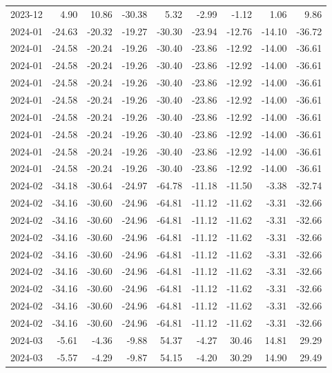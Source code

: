 \begin{table}[ht]
\begin{tabular}{lrrrrrrrr}
  2023-12 & 4.90 & 10.86 & -30.38 & 5.32 & -2.99 & -1.12 & 1.06 & 9.86 \\ 
  2024-01 & -24.63 & -20.32 & -19.27 & -30.30 & -23.94 & -12.76 & -14.10 & -36.72 \\ 
  2024-01 & -24.58 & -20.24 & -19.26 & -30.40 & -23.86 & -12.92 & -14.00 & -36.61 \\ 
  2024-01 & -24.58 & -20.24 & -19.26 & -30.40 & -23.86 & -12.92 & -14.00 & -36.61 \\ 
  2024-01 & -24.58 & -20.24 & -19.26 & -30.40 & -23.86 & -12.92 & -14.00 & -36.61 \\ 
  2024-01 & -24.58 & -20.24 & -19.26 & -30.40 & -23.86 & -12.92 & -14.00 & -36.61 \\ 
  2024-01 & -24.58 & -20.24 & -19.26 & -30.40 & -23.86 & -12.92 & -14.00 & -36.61 \\ 
  2024-01 & -24.58 & -20.24 & -19.26 & -30.40 & -23.86 & -12.92 & -14.00 & -36.61 \\ 
  2024-01 & -24.58 & -20.24 & -19.26 & -30.40 & -23.86 & -12.92 & -14.00 & -36.61 \\ 
  2024-01 & -24.58 & -20.24 & -19.26 & -30.40 & -23.86 & -12.92 & -14.00 & -36.61 \\ 
  2024-02 & -34.18 & -30.64 & -24.97 & -64.78 & -11.18 & -11.50 & -3.38 & -32.74 \\ 
  2024-02 & -34.16 & -30.60 & -24.96 & -64.81 & -11.12 & -11.62 & -3.31 & -32.66 \\ 
  2024-02 & -34.16 & -30.60 & -24.96 & -64.81 & -11.12 & -11.62 & -3.31 & -32.66 \\ 
  2024-02 & -34.16 & -30.60 & -24.96 & -64.81 & -11.12 & -11.62 & -3.31 & -32.66 \\ 
  2024-02 & -34.16 & -30.60 & -24.96 & -64.81 & -11.12 & -11.62 & -3.31 & -32.66 \\ 
  2024-02 & -34.16 & -30.60 & -24.96 & -64.81 & -11.12 & -11.62 & -3.31 & -32.66 \\ 
  2024-02 & -34.16 & -30.60 & -24.96 & -64.81 & -11.12 & -11.62 & -3.31 & -32.66 \\ 
  2024-02 & -34.16 & -30.60 & -24.96 & -64.81 & -11.12 & -11.62 & -3.31 & -32.66 \\ 
  2024-02 & -34.16 & -30.60 & -24.96 & -64.81 & -11.12 & -11.62 & -3.31 & -32.66 \\ 
  2024-03 & -5.61 & -4.36 & -9.88 & 54.37 & -4.27 & 30.46 & 14.81 & 29.29 \\ 
  2024-03 & -5.57 & -4.29 & -9.87 & 54.15 & -4.20 & 30.29 & 14.90 & 29.49 \\ 

\end{tabular}
\end{table}
